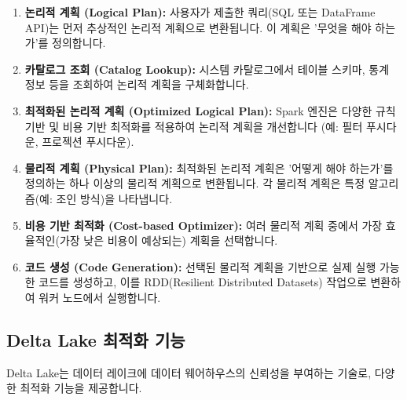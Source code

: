 \documentclass[11pt,a4paper]{article}
\theoremstyle{definition}
\begin{document}
\begin{enumerate}
    \item \textbf{논리적 계획 (Logical Plan):} 사용자가 제출한 쿼리(SQL 또는 DataFrame API)는 먼저 추상적인 논리적 계획으로 변환됩니다. 이 계획은 '무엇을 해야 하는가'를 정의합니다.
    \item \textbf{카탈로그 조회 (Catalog Lookup):} 시스템 카탈로그에서 테이블 스키마, 통계 정보 등을 조회하여 논리적 계획을 구체화합니다.
    \item \textbf{최적화된 논리적 계획 (Optimized Logical Plan):} Spark 엔진은 다양한 규칙 기반 및 비용 기반 최적화를 적용하여 논리적 계획을 개선합니다 (예: 필터 푸시다운, 프로젝션 푸시다운).
    \item \textbf{물리적 계획 (Physical Plan):} 최적화된 논리적 계획은 '어떻게 해야 하는가'를 정의하는 하나 이상의 물리적 계획으로 변환됩니다. 각 물리적 계획은 특정 알고리즘(예: 조인 방식)을 나타냅니다.
    \item \textbf{비용 기반 최적화 (Cost-based Optimizer):} 여러 물리적 계획 중에서 가장 효율적인(가장 낮은 비용이 예상되는) 계획을 선택합니다.
    \item \textbf{코드 생성 (Code Generation):} 선택된 물리적 계획을 기반으로 실제 실행 가능한 코드를 생성하고, 이를 RDD(Resilient Distributed Datasets) 작업으로 변환하여 워커 노드에서 실행합니다.
\end{enumerate}

\subsection{Delta Lake 최적화 기능}
Delta Lake는 데이터 레이크에 데이터 웨어하우스의 신뢰성을 부여하는 기술로, 다양한 최적화 기능을 제공합니다.
\end{document}
